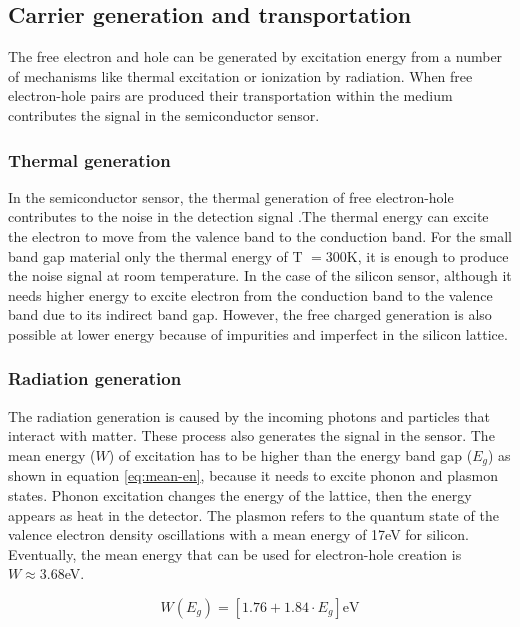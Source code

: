 \documentclass[12pt,a4paper]{article}
\begin{document}
\subsection{Carrier generation and transportation}
The free electron and hole can be generated by excitation energy from a number of mechanisms like thermal excitation or ionization by radiation. When free electron-hole pairs are produced their transportation within the medium contributes the signal in the semiconductor sensor. 

\subsubsection{Thermal generation}

In the semiconductor sensor, the thermal generation of free electron-hole contributes to  the noise in the detection signal .The thermal energy can excite the electron  to move from the valence band to the conduction band. For  the small band gap  material only the  thermal energy of T $= 300$K, it is enough to produce the noise signal at room temperature. In the case of the silicon sensor, although it  needs higher  energy to excite electron from the conduction band to the valence band due to its indirect band gap. However, the free   charged generation is also possible at  lower energy because of impurities and imperfect in the silicon lattice.
\subsubsection{Radiation generation}

The radiation generation is caused by the incoming photons and particles that interact with matter.  These process also generates the signal in the sensor. The mean energy ($W$) of excitation has to be higher than the energy band gap ($E_g$) as shown in equation \ref{eq:mean-en}, because it needs to excite phonon and plasmon states. Phonon excitation changes the energy of the lattice, then the energy appears as heat in the detector. The plasmon refers to the quantum state of the valence electron density oscillations with a mean energy of 17eV for silicon. Eventually, the mean energy that can be used for electron-hole creation is $W \approx 3.68$eV\cite{SiliconDetectorbook}.

\begin{equation}
    \label{eq:mean-en}
    W(E_g) = \left[1.76 + 1.84\cdot E_g\right]\mathrm{eV}
\end{equation}
\end{document}
